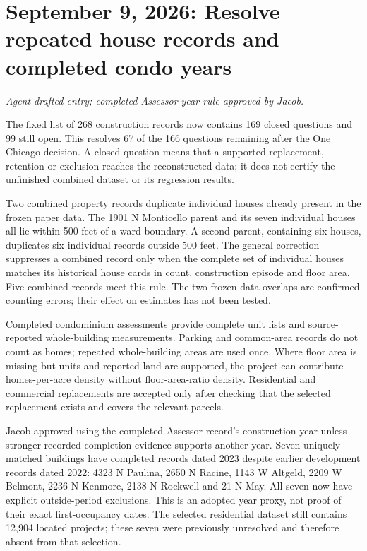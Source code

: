 \clearpage
\section*{September 9, 2026: Resolve repeated house records and completed condo years}
\textit{Agent-drafted entry; completed-Assessor-year rule approved by Jacob.}

The fixed list of 268 construction records now contains 169 closed questions and 99 still open. This resolves 67 of the 166 questions remaining after the One Chicago decision. A closed question means that a supported replacement, retention or exclusion reaches the reconstructed data; it does not certify the unfinished combined dataset or its regression results.

Two combined property records duplicate individual houses already present in the frozen paper data. The 1901 N Monticello parent and its seven individual houses all lie within 500 feet of a ward boundary. A second parent, containing six houses, duplicates six individual records outside 500 feet. The general correction suppresses a combined record only when the complete set of individual houses matches its historical house cards in count, construction episode and floor area. Five combined records meet this rule. The two frozen-data overlaps are confirmed counting errors; their effect on estimates has not been tested.

Completed condominium assessments provide complete unit lists and source-reported whole-building measurements. Parking and common-area records do not count as homes; repeated whole-building areas are used once. Where floor area is missing but units and reported land are supported, the project can contribute homes-per-acre density without floor-area-ratio density. Residential and commercial replacements are accepted only after checking that the selected replacement exists and covers the relevant parcels.

Jacob approved using the completed Assessor record's construction year unless stronger recorded completion evidence supports another year. Seven uniquely matched buildings have completed records dated 2023 despite earlier development records dated 2022: 4323 N Paulina, 2650 N Racine, 1143 W Altgeld, 2209 W Belmont, 2236 N Kenmore, 2138 N Rockwell and 21 N May. All seven now have explicit outside-period exclusions. This is an adopted year proxy, not proof of their exact first-occupancy dates. The selected residential dataset still contains 12,904 located projects; these seven were previously unresolved and therefore absent from that selection.

